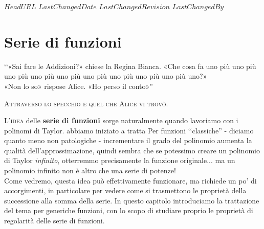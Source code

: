 \svnidlong
{$HeadURL$}
{$LastChangedDate$}
{$LastChangedRevision$}
{$LastChangedBy$}

\chapter{Serie di funzioni}

\begin{introduction}
	‘‘«Sai fare le Addizioni?» chiese la Regina Bianca. «Che cosa fa uno più uno più uno	più uno più uno più uno più uno più uno più uno più uno?»\\
	«Non lo so» rispose Alice. «Ho perso il conto»''
\begin{flushright}
	\textsc{Attraverso lo specchio e quel che Alice vi trovò.}
\end{flushright}
\end{introduction}
\lettrine[findent=1pt, nindent=0pt]{L}{'idea} delle \textbf{serie di funzioni} sorge naturalmente quando lavoriamo con i polinomi di Taylor.  abbiamo iniziato a tratta Per funzioni ‘‘classiche'' - diciamo quanto meno non patologiche - incrementare il grado del polinomio aumenta la qualità dell'approssimazione, quindi sembra che se potessimo creare un polinomio di Taylor \textit{infinito}, otterremmo precisamente la funzione originale... ma un polinomio infinito non è altro che una serie di potenze!\\
Come vedremo, questa idea può effettivamente funzionare, ma richiede un po' di accorgimenti, in particolare per vedere come si trasmettono le proprietà della successione alla somma della serie. In questo capitolo introduciamo la trattazione del tema per generiche funzioni, con lo scopo di studiare proprio le proprietà di regolarità delle serie di funzioni.
